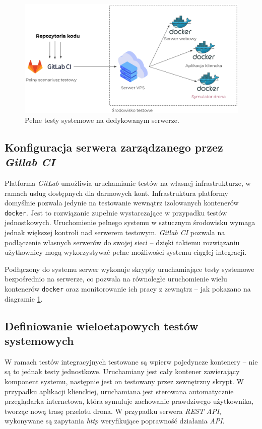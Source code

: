 \begin{figure}[H]
	\centering
	\includegraphics[width=\linewidth]{rys05/integration_tests_diagram.png}
    \caption{
        Pełne testy systemowe na dedykowanym serwerze.
    }
	\label{system_tests_diagram}
\end{figure}

\subsection{Konfiguracja serwera zarządzanego przez \textit{Gitlab CI}}

Platforma \textit{GitLab} umożliwia uruchamianie testów na własnej
infrastrukturze, w ramach usług dostępnych dla darmowych kont.
Infrastruktura platformy domyślnie pozwala jedynie
na testowanie wewnątrz izolowanych kontenerów \texttt{docker}.
Jest to rozwiązanie zupełnie wystarczające w przypadku testów jednostkowych.
Uruchomienie pełnego systemu w sztucznym środowisku wymaga jednak
większej kontroli nad serwerem testowym. \textit{Gitlab CI} pozwala
na podłączenie własnych serwerów do swojej sieci -- dzięki takiemu rozwiązaniu
użytkownicy mogą wykorzystywać pełne możliwości systemu ciągłej integracji.

Podłączony do systemu serwer wykonuje skrypty uruchamiające testy systemowe 
bezpośrednio na serwerze, co pozwala na równoległe uruchomienie wielu kontenerów 
\texttt{docker} oraz monitorowanie ich pracy z zewnątrz -- jak pokazano
na diagramie \ref{system_tests_diagram}.

\subsection{Definiowanie wieloetapowych testów systemowych}

W ramach testów integracyjnych testowane są wpierw pojedyncze kontenery --
nie są to jednak testy jednostkowe. Uruchamiany jest cały kontener zawierający
komponent systemu, następnie jest on testowany przez zewnętrzny skrypt.
W przypadku aplikacji klienckiej, uruchamiana jest sterowana automatycznie 
przeglądarka internetowa, która symuluje zachowanie prawdziwego użytkownika,
tworząc nową trasę przelotu drona. W przypadku serwera \textit{REST API}, wykonywane
są zapytania \textit{http} weryfikujące poprawność działania \textit{API}.

